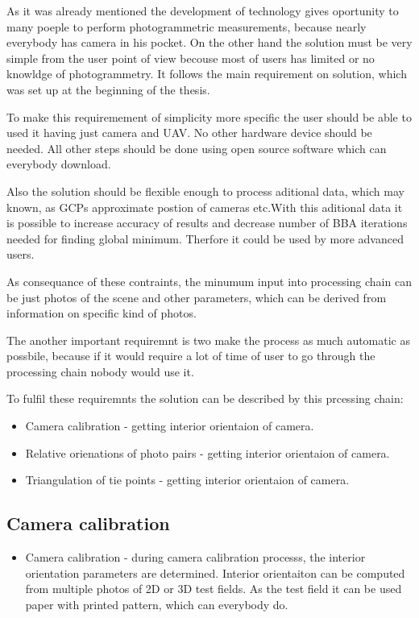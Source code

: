 \documentclass[a4paper,12pt]{report}
\begin{document}
\begin{itemize}
  
As it was already mentioned the development of technology gives oportunity to many poeple
to perform photogrammetric measurements, because nearly everybody has camera in his pocket.
On the other hand the solution must be very simple from the user point of view becouse 
most of users has limited or no knowldge of photogrammetry. It follows the main requirement 
on solution, which was set up at the beginning of the thesis.

To make this requiremement of simplicity more specific the user should be able to used it having 
just camera and UAV. No other hardware device should be needed. All other steps should be done 
using open source software which can everybody download.

Also the solution should be flexible enough to process aditional data, which may known, 
as GCPs approximate postion of cameras etc.With this aditional data it is possible 
to increase accuracy of results and decrease number of  BBA iterations needed for finding 
global minimum. Therfore it could be used by more advanced users.

As consequance of these contraints, the minumum input into processing chain can be just photos
of the scene and other parameters, which can be derived from information on specific kind of photos.

The another important requiremnt is two make the process as much automatic as possbile, because 
if it would require a lot of time of user to go through the processing chain nobody would use it.

To fulfil these requiremnts the solution can be described by this prcessing chain:

\begin{itemize}
\item Camera calibration - getting interior orientaion of camera.
\item Relative orienations of photo pairs - getting interior orientaion of camera.
\item Triangulation of tie points - getting interior orientaion of camera.

\end{itemize}




\subsection{Camera calibration}
\begin{itemize}
\item Camera calibration - during camera calibration processs, the interior orientation parameters 
			   are determined.
		             Interior orientaiton can be computed 
			     from multiple photos of 2D or 3D test fields. As the test field it can be used 
			     paper with printed pattern, which can everybody do. 
				

\end{itemize}
\end{itemize}
\end{document}
